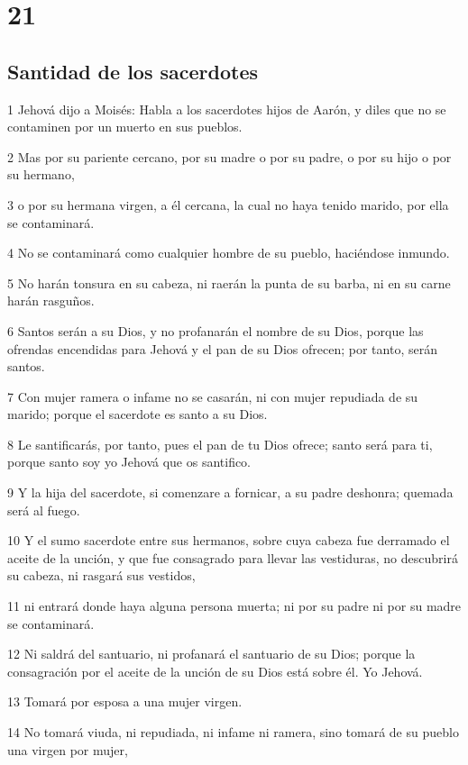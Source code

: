 \chapter{21}

\section*{Santidad de los sacerdotes}

\par 1 Jehová dijo a Moisés: Habla a los sacerdotes hijos de Aarón, y diles que no se contaminen por un muerto en sus pueblos.
\par 2 Mas por su pariente cercano, por su madre o por su padre, o por su hijo o por su hermano,
\par 3 o por su hermana virgen, a él cercana, la cual no haya tenido marido, por ella se contaminará.
\par 4 No se contaminará como cualquier hombre de su pueblo, haciéndose inmundo.
\par 5 No harán tonsura en su cabeza, ni raerán la punta de su barba, ni en su carne harán rasguños.
\par 6 Santos serán a su Dios, y no profanarán el nombre de su Dios, porque las ofrendas encendidas para Jehová y el pan de su Dios ofrecen; por tanto, serán santos.
\par 7 Con mujer ramera o infame no se casarán, ni con mujer repudiada de su marido; porque el sacerdote es santo a su Dios.
\par 8 Le santificarás, por tanto, pues el pan de tu Dios ofrece; santo será para ti, porque santo soy yo Jehová que os santifico.
\par 9 Y la hija del sacerdote, si comenzare a fornicar, a su padre deshonra; quemada será al fuego.
\par 10 Y el sumo sacerdote entre sus hermanos, sobre cuya cabeza fue derramado el aceite de la unción, y que fue consagrado para llevar las vestiduras, no descubrirá su cabeza, ni rasgará sus vestidos,
\par 11 ni entrará donde haya alguna persona muerta; ni por su padre ni por su madre se contaminará.
\par 12 Ni saldrá del santuario, ni profanará el santuario de su Dios; porque la consagración por el aceite de la unción de su Dios está sobre él. Yo Jehová.
\par 13 Tomará por esposa a una mujer virgen.
\par 14 No tomará viuda, ni repudiada, ni infame ni ramera, sino tomará de su pueblo una virgen por mujer,
